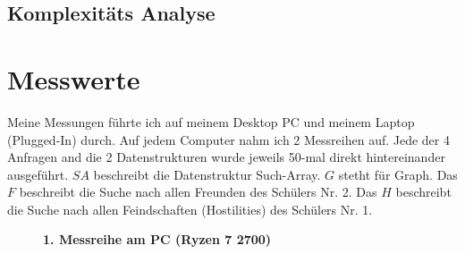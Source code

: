 \documentclass[11pt,a4paper]{article}
\begin{document}
\subsection{Komplexitäts Analyse}

\section{Messwerte}

Meine Messungen führte ich auf meinem Desktop PC und meinem Laptop (Plugged-In) durch.
Auf jedem Computer nahm ich 2 Messreihen auf.
Jede der 4 Anfragen and die 2 Datenstrukturen wurde jeweils 50-mal direkt hintereinander
ausgeführt.
$SA$ beschreibt die Datenstruktur Such-Array. $G$ stetht für Graph.
Das $F$ beschreibt die Suche nach allen Freunden des Schülers Nr. 2.
Das $H$ beschreibt die Suche nach allen Feindschaften (Hostilities) des Schülers Nr. 1.

\vspace*{1cm}

\begin{figure}[H]
    \centering
    \vspace*{-0.8cm}
    \caption{\textbf{1. Messreihe am PC (Ryzen 7 2700)}}
\end{figure}
\end{document}
